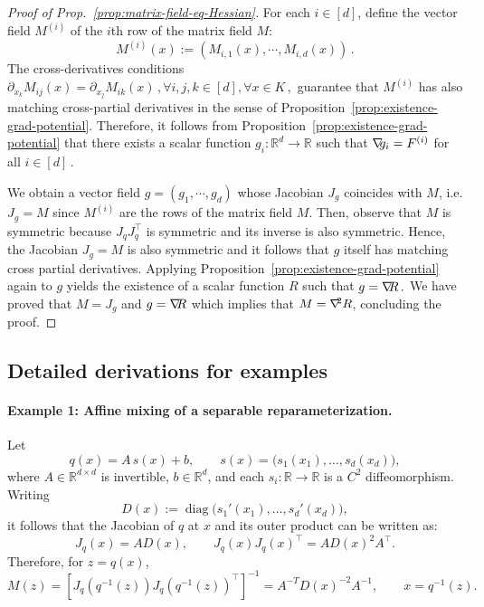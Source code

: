 \documentclass[a4paper,11pt,fullpage]{article}
\theoremstyle{plain}
\theoremstyle{definition}
\theoremstyle{plain}
\let\nablaold\nabla
\renewcommand{\nabla}{\nablaold\mkern-2.5mu}
\begin{document}
\begin{proof}[Proof of Prop.~\ref{prop:matrix-field-eq-Hessian}]
For each $i \in [d]$, define the vector field $M^{(i)}$ of the $i$th row of the matrix field $M$: 
\begin{equation*}
M^{(i)}(x) := (M_{i,1}(x), \cdots, M_{i,d}(x))\,.
\end{equation*}
The cross-derivatives conditions $\partial_{x_k} M_{ij}(x) = \partial_{x_j} M_{ik}(x)\,,\forall i, j, k \in [d], \forall x \in K\,,$ guarantee that $M^{(i)}$ has also matching cross-partial derivatives in the sense of Proposition~\ref{prop:existence-grad-potential}. Therefore, it follows from Proposition~\ref{prop:existence-grad-potential} that there exists a scalar function $g_i: \mathbb{R}^d \to \mathbb{R}$ such that $\nabla g_i = F^{(i)}$ for all $i \in [d]\,.$ 

We obtain a vector field $g = (g_1, \cdots, g_d)$ whose Jacobian $J_g$ coincides with $M$, i.e. $J_g = M$ since $M^{(i)}$ are the rows of the matrix field $M$. Then, observe that $M$ is symmetric because $J_q J_q^{\top}$ is symmetric and its inverse is also symmetric. Hence, the Jacobian $J_g = M$ is also symmetric and it follows that $g$ itself has matching cross partial derivatives. Applying Proposition~\ref{prop:existence-grad-potential} again to $g$ yields the existence of a scalar function $R$ such that $g = \nabla R\,.$ We have proved that $M = J_g$ and $g = \nabla R$ which implies that $M = \nabla^2 R$, concluding the proof. 
\end{proof}

\subsection{Detailed derivations for examples}
\label{appx:detailed-examples}

\paragraph{Example 1: Affine mixing of a separable reparameterization.}
Let
\[
    q(x)=A\,s(x)+b,
    \qquad
    s(x)=\bigl(s_1(x_1),\dots,s_d(x_d)\bigr),
\]
where \(A\in\mathbb R^{d\times d}\) is invertible, \(b\in\mathbb R^d\), and each
\(s_i:\mathbb R\to\mathbb R\) is a \(C^2\) diffeomorphism. 
Writing
\[
    D(x):=\operatorname{diag}\bigl(s_1'(x_1),\dots,s_d'(x_d)\bigr),
\]
it follows that the Jacobian of $q$ at $x$ and its outer product can be written as: 
\[
    J_q(x)=A D(x),
    \qquad
    J_q(x)J_q(x)^\top=A D(x)^2 A^\top.
\]
Therefore, for \(z=q(x)\),
\[
    M(z)
    =
    \left[J_q(q^{-1}(z))J_q(q^{-1}(z))^\top\right]^{-1}
    =
    A^{-T}D(x)^{-2}A^{-1},
    \qquad x=q^{-1}(z).
\]
\end{document}
